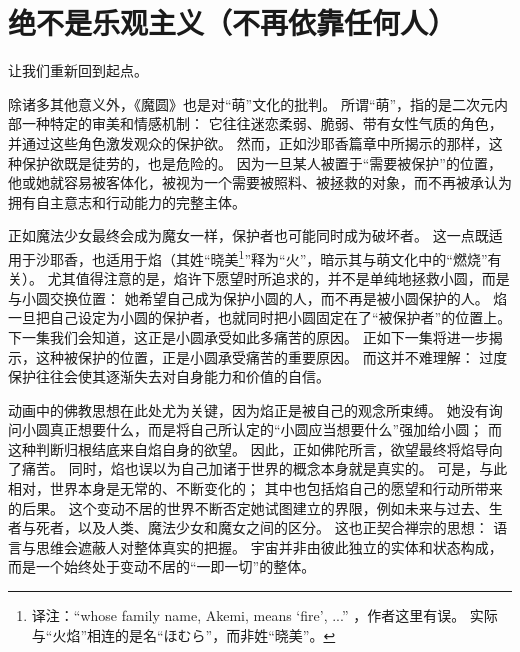 \chapter[绝不是乐观主义（不再依靠任何人）]{绝不是乐观主义\protect\footnotemark（不再依靠任何人）}


让我们重新回到起点。

除诸多其他意义外，《魔圆》也是对“萌”文化的批判。
所谓“萌”，指的是二次元内部一种特定的审美和情感机制：
它往往迷恋柔弱、脆弱、带有女性气质的角色，并通过这些角色激发观众的保护欲。
然而，正如沙耶香篇章中所揭示的那样，这种保护欲既是徒劳的，也是危险的。
因为一旦某人被置于“需要被保护”的位置，他或她就容易被客体化，被视为一个需要被照料、被拯救的对象，而不再被承认为拥有自主意志和行动能力的完整主体。

正如魔法少女最终会成为魔女一样，保护者也可能同时成为破坏者。
这一点既适用于沙耶香，也适用于焰（其姓“晓美\footnote{%
    译注：``whose family name, Akemi, means `fire', ...''
    ，作者这里有误。
    实际与“火焰”相连的是名“ほむら”，而非姓“晓美”。
}”释为“火”，暗示其与萌文化中的“燃烧”有关）。
尤其值得注意的是，焰许下愿望时所追求的，并不是单纯地拯救小圆，而是与小圆交换位置：
她希望自己成为保护小圆的人，而不再是被小圆保护的人。
焰一旦把自己设定为小圆的保护者，也就同时把小圆固定在了“被保护者”的位置上。
下一集我们会知道，这正是小圆承受如此多痛苦的原因。
正如下一集将进一步揭示，这种被保护的位置，正是小圆承受痛苦的重要原因。
而这并不难理解：
过度保护往往会使其逐渐失去对自身能力和价值的自信。

动画中的佛教思想在此处尤为关键，因为焰正是被自己的观念所束缚。
她没有询问小圆真正想要什么，而是将自己所认定的“小圆应当想要什么”强加给小圆；
而这种判断归根结底来自焰自身的欲望。
因此，正如佛陀所言，欲望最终将焰导向了痛苦\cite{ref62}。
同时，焰也误以为自己加诸于世界的概念本身就是真实的。
可是，与此相对，世界本身是无常的、不断变化的；
其中也包括焰自己的愿望和行动所带来的后果。
这个变动不居的世界不断否定她试图建立的界限，例如未来与过去、生者与死者，以及人类、魔法少女和魔女之间的区分。
这也正契合禅宗的思想：
语言与思维会遮蔽人对整体真实的把握。
宇宙并非由彼此独立的实体和状态构成，而是一个始终处于变动不居的“一即一切”的整体\cite{ref63}。

